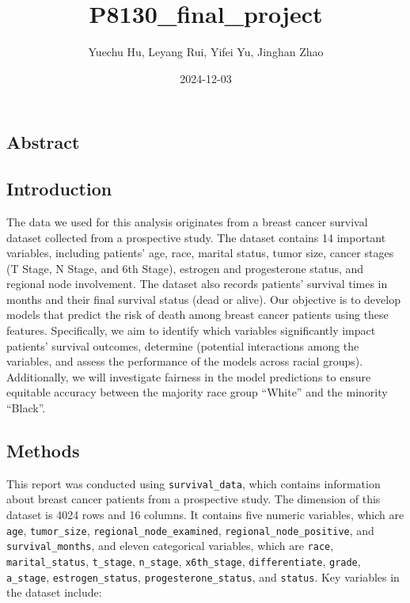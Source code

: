 \documentclass[
]{article}
\title{P8130\_final\_project}
\author{Yuechu Hu, Leyang Rui, Yifei Yu, Jinghan Zhao}
\date{2024-12-03}
\begin{document}
\maketitle

\subsection{Abstract}\label{abstract}

\subsection{Introduction}\label{introduction}

The data we used for this analysis originates from a breast cancer
survival dataset collected from a prospective study. The dataset
contains 14 important variables, including patients' age, race, marital
status, tumor size, cancer stages (T Stage, N Stage, and 6th Stage),
estrogen and progesterone status, and regional node involvement. The
dataset also records patients' survival times in months and their final
survival status (dead or alive). Our objective is to develop models that
predict the risk of death among breast cancer patients using these
features. Specifically, we aim to identify which variables significantly
impact patients' survival outcomes, determine (potential interactions
among the variables, and assess the performance of the models across
racial groups). Additionally, we will investigate fairness in the model
predictions to ensure equitable accuracy between the majority race group
``White'' and the minority ``Black''.

\subsection{Methods}\label{methods}

This report was conducted using \texttt{survival\_data}, which contains
information about breast cancer patients from a prospective study. The
dimension of this dataset is 4024 rows and 16 columns. It contains five
numeric variables, which are \texttt{age}, \texttt{tumor\_size},
\texttt{regional\_node\_examined}, \texttt{regional\_node\_positive},
and \texttt{survival\_months}, and eleven categorical variables, which
are \texttt{race}, \texttt{marital\_status}, \texttt{t\_stage},
\texttt{n\_stage}, \texttt{x6th\_stage}, \texttt{differentiate},
\texttt{grade}, \texttt{a\_stage}, \texttt{estrogen\_status},
\texttt{progesterone\_status}, and \texttt{status}. Key variables in the
dataset include:
\end{document}
